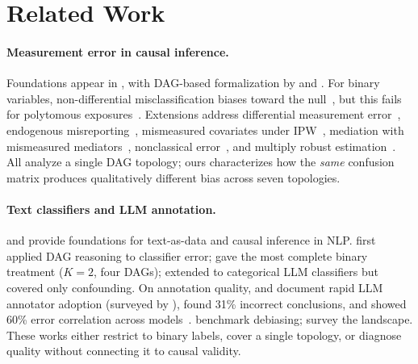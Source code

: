\section{Related Work}
\label{sec:related_work}

\paragraph{Measurement error in causal inference.}
Foundations appear in \citet{carroll2006, gustafson2004, buonaccorsi2010, bound2001measurement}, with DAG-based formalization by \citet{hernan_cole2009} and \citet{kuroki_pearl2014}. For binary variables, non-differential misclassification biases toward the null~\cite{bross1954misclassification, brenner1993, ogburn_vanderweele2012}, but this fails for polytomous exposures~\cite{dosemeci1990, jurek2005, veirod_laake2001}. Extensions address differential measurement error~\cite{edwards_lessler_naimi2021, imai_yamamoto2010}, endogenous misreporting~\cite{nguimkeu_denteh_tchernis2019}, mismeasured covariates under IPW~\cite{shu_yi2019a, shu_yi2019b}, mediation with mismeasured mediators~\cite{valeri_vanderweele2013}, nonclassical error~\cite{schennach2020mismeasured}, and multiply robust estimation~\cite{wei2025multiply}. All analyze a single DAG topology; ours characterizes how the \emph{same} confusion matrix produces qualitatively different bias across seven topologies.

\paragraph{Text classifiers and LLM annotation.}
\citet{grimmer2022} and \citet{feder_etal2022} provide foundations for text-as-data and causal inference in NLP. \citet{wood_doughty2018} first applied DAG reasoning to classifier error; \citet{teblunthuis2024} gave the most complete binary treatment ($K{=}2$, four DAGs); \citet{lee_wood_doughty2024} extended to categorical LLM classifiers but covered only confounding. On annotation quality, \citet{gilardi2023chatgpt} and \citet{ziems2024can} document rapid LLM annotator adoption (surveyed by \citealt{tan2024llm}), \citet{baumann2025} found 31\% incorrect conclusions, and \citet{kim_garg2025} showed 60\% error correlation across models~\cite{pangakis_wolken_fasching2023, cheng_mayya_sedoc2024, variance_aware_llm2026, hidden_measurement_error2026}. \citet{audinet2025} benchmark debiasing; \citet{keith_jensen_oconnor2020} survey the landscape. These works either restrict to binary labels, cover a single topology, or diagnose quality without connecting it to causal validity.

